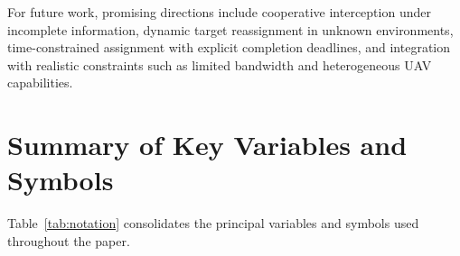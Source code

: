 \documentclass[lettersize,journal]{IEEEtran}
\newcommand{\hladd}[1]{{\color{blue}#1}}
\begin{document}
For future work, promising directions include cooperative interception under incomplete
information, dynamic target reassignment in unknown environments, time-constrained assignment
with explicit completion deadlines, and integration with realistic constraints such as
limited bandwidth and heterogeneous UAV capabilities.









\appendices
\section{\hladd{Summary of Key Variables and Symbols}}
\label{app:notation}

\hladd{Table~\ref{tab:notation} consolidates the principal variables and symbols used throughout the paper.}
\end{document}
